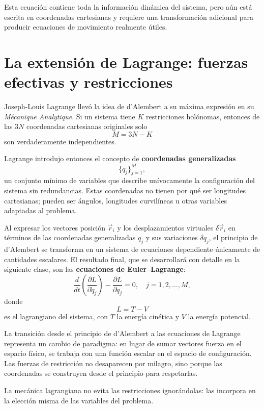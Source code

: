 Esta ecuación contiene toda la información dinámica del sistema, pero aún está escrita en coordenadas cartesianas y requiere una transformación adicional para producir ecuaciones de movimiento realmente útiles.

\section{La extensión de Lagrange: fuerzas efectivas y restricciones}
Joseph-Louis Lagrange llevó la idea de d'Alembert a su máxima expresión en su \emph{Mécanique Analytique}. Si un sistema tiene \(K\) restricciones holónomas, entonces de las \(3N\) coordenadas cartesianas originales solo
\[
 M = 3N - K
\]
son verdaderamente independientes.

Lagrange introdujo entonces el concepto de \textbf{coordenadas generalizadas}
\[
 \{q_j\}_{j=1}^{M},
\]
un conjunto mínimo de variables que describe unívocamente la configuración del sistema sin redundancias. Estas coordenadas no tienen por qué ser longitudes cartesianas; pueden ser ángulos, longitudes curvilíneas u otras variables adaptadas al problema.

Al expresar los vectores posición \(\vec{r}_i\) y los desplazamientos virtuales \(\delta\vec{r}_i\) en términos de las coordenadas generalizadas \(q_j\) y sus variaciones \(\delta q_j\), el principio de d'Alembert se transforma en un sistema de ecuaciones dependiente únicamente de cantidades escalares. El resultado final, que se desarrollará con detalle en la siguiente clase, son las \textbf{ecuaciones de Euler--Lagrange}:
\[
 \frac{d}{dt}\left(\frac{\partial L}{\partial \dot{q}_j}\right) - \frac{\partial L}{\partial q_j} = 0,
 \quad j = 1,2,\dots,M,
\]
donde
\[
 L = T - V
\]
es el lagrangiano del sistema, con \(T\) la energía cinética y \(V\) la energía potencial.

La transición desde el principio de d'Alembert a las ecuaciones de Lagrange representa un cambio de paradigma: en lugar de sumar vectores fuerza en el espacio físico, se trabaja con una función escalar en el espacio de configuración. Las fuerzas de restricción no desaparecen por milagro, sino porque las coordenadas se construyen desde el principio para respetarlas.

\begin{importante}
La mecánica lagrangiana no evita las restricciones ignorándolas: las incorpora en la elección misma de las variables del problema.
\end{importante}

